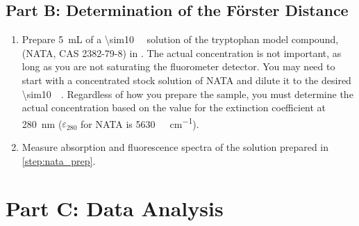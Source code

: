 
\subsection{Part B: Determination of the Förster Distance} %
\label{sub:part_b_determination_of_the_forster_distance}

\begin{enumerate}
	\item Prepare \SI{5}{\mL} of a \SI{\sim10}{\micro\Molar} solution of the tryptophan model compound,  (NATA, CAS 2382-79-8) in . 
	The actual concentration is not important, as long as you are not saturating the fluorometer detector. 
	You may need to start with a concentrated stock solution of NATA and dilute it to the desired \SI{\sim10}{\micro\Molar}. 
	Regardless of how you prepare the sample, you must determine the actual concentration based on the value for the extinction coefficient at \SI{280}{\nm} (\( \varepsilon_{280} \) for NATA is \SI{5630}{\per\Molar\per\cm}).
	\label{step:nata_prep}
	\item Measure absorption and fluorescence spectra of the solution prepared in \cref{step:nata_prep}.
	\label{step:nata_spectrum} 
\end{enumerate}


\section{Part C: Data Analysis} %
\label{sec:part_c_data_analysis}

